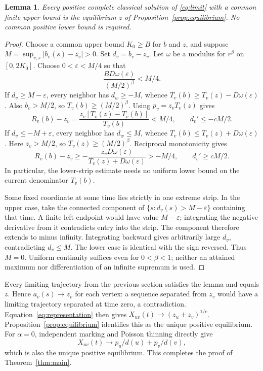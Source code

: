 \documentclass[11pt,a4paper]{article}
\newtheorem{lemma}[theorem]{Lemma}
\newcommand{\Tv}{T_v}
\begin{document}
\begin{lemma}\label{lem:rigidity}
Every positive complete classical solution of \eqref{eq:limit} with a common
finite upper bound is the equilibrium $z$ of Proposition~\ref{prop:equilibrium}.
No common positive lower bound is required.
\end{lemma}
\begin{proof}
Choose a common upper bound $K_0\geq B$ for $b$ and $z$, and suppose
$M=\sup_{v,s}|b_v(s)-z_v|>0$. Set $d_v=b_v-z_v$. Let $\omega$ be a modulus
for $r^\beta$ on $[0,2K_0]$. Choose $0<\varepsilon<M/4$ so that
\[
 \frac{BD\omega(\varepsilon)}{(M/2)^\beta}<M/4.
\]
If $d_v\geq M-\varepsilon$, every neighbor has $d_w\geq-M$, whence
$\Tv(b)\geq\Tv(z)-D\omega(\varepsilon)$. Also $b_v>M/2$, so
$\Tv(b)\geq(M/2)^\beta$. Using $p_v=z_v\Tv(z)$ gives
\[
 R_v(b)-z_v=\frac{z_v[\Tv(z)-\Tv(b)]}{\Tv(b)}<M/4,
 \qquad d_v'\leq-cM/2.
\]
If $d_v\leq-M+\varepsilon$, every neighbor has $d_w\leq M$, whence
$\Tv(b)\leq\Tv(z)+D\omega(\varepsilon)$. Here $z_v>M/2$, so
$\Tv(z)\geq(M/2)^\beta$. Reciprocal monotonicity gives
\[
 R_v(b)-z_v\geq
 -\frac{z_vD\omega(\varepsilon)}{\Tv(z)+D\omega(\varepsilon)}>-M/4,
 \qquad d_v'\geq cM/2.
\]
In particular, the lower-strip estimate needs no uniform lower bound on the
current denominator $\Tv(b)$.

Some fixed coordinate at some time lies strictly in one extreme strip.
In the upper case, take the connected component of
$\{s:d_v(s)>M-\varepsilon\}$ containing that time. A finite left endpoint
would have value $M-\varepsilon$; integrating the negative derivative from it
contradicts entry into the strip. The component therefore extends to minus
infinity. Integrating backward gives arbitrarily large $d_v$, contradicting
$d_v\leq M$. The lower case is identical with the sign reversed. Thus $M=0$.
Uniform continuity suffices even for $0<\beta<1$; neither an attained maximum
nor differentiation of an infinite supremum is used.
\end{proof}

Every limiting trajectory from the previous section satisfies the lemma and
equals $z$. Hence $a_v(s)\to z_v$ for each vertex: a sequence separated from
$z_v$ would have a limiting trajectory separated at time zero, a contradiction.
Equation~\eqref{eq:representation} then gives
$X_{uv}(t)\to(z_u+z_v)^{1/c}$. Proposition~\ref{prop:equilibrium} identifies
this as the unique positive equilibrium. For $\alpha=0$, independent marking
and Poisson thinning directly give
\[
 X_{uv}(t)\longrightarrow p_u/d(u)+p_v/d(v),
\]
which is also the unique positive equilibrium. This completes the proof of
Theorem~\ref{thm:main}.
\end{document}
